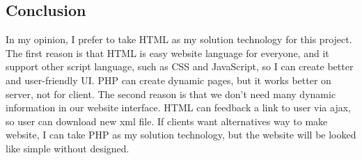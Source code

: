 \subsection{Conclusion}
In my opinion, I prefer to take HTML as my solution technology for this project. The first reason is that HTML is easy website language for everyone, and it support other script language, such as CSS and JavaScript, so I can create better and user-friendly UI. PHP can create dynamic pages, but it works better on server, not for client. The second reason is that we don't need many dynamic information in our website interface. HTML can feedback a link to user via ajax, so user can download new xml file.
If clients want alternatives way to make website, I can take PHP as my solution technology, but the website will be looked like simple without designed.